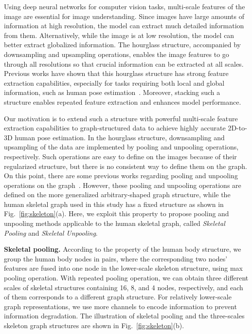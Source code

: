 \documentclass[final]{cvpr}
\begin{document}
Using deep neural networks for computer vision tasks, multi-scale features of the image are essential for image understanding.
Since images have large amounts of information at high resolution, the model can extract much detailed information from them. Alternatively, while the image is at low resolution, the model can better extract globalized information. 
The hourglass structure, accompanied by downsampling and upsampling operations, enables the image features to go through all resolutions so that crucial information can be extracted at all scales.
Previous works have shown that this hourglass structure has strong feature extraction capabilities, especially for tasks requiring both local and global information, such as human pose estimation~\cite{Newell2016StackedHN, NIPS2017_8edd7215}.
Moreover, stacking such a structure enables repeated feature extraction and enhances model performance.

Our motivation is to extend such a structure with powerful multi-scale feature extraction capabilities to graph-structured data to achieve highly accurate 2D-to-3D human pose estimation.
In the hourglass structure, downsampling and upsampling of the data are implemented by pooling and unpooling operations, respectively. 
Such operations are easy to define on the images because of their regularized structure, but there is no consistent way to define them on the graph.
On this point, there are some previous works regarding pooling and unpooling operations on the graph~\cite{gao2019graph, Lee2019SelfAttentionGP}. 
However, these pooling and unpooling operations are defined on the more generalized arbitrary-shaped graph structure, while the human skeletal graph used in this study has a fixed structure as shown in Fig.~\ref{fig:skeleton}(a). 
Here, we exploit this property to propose pooling and unpooling methods applicable to the human skeletal graph, called \textit{Skeletal Pooling} and \textit{Skeletal Unpooling}.

\textbf{Skeletal pooling.}
According to the property of the human body structure, we group the human body nodes in pairs, where the corresponding two nodes' features are fused into one node in the lower-scale skeleton structure, using max pooling operation.
With repeated pooling operation, we can obtain three different scales of skeletal structures containing 16, 8, and 4 nodes, respectively, and each of them corresponds to a different graph structure.
For relatively lower-scale graph representations, we use more channels to encode information to prevent information degradation.
The illustration of skeletal pooling and the three-scales skeleton graph structures are shown in Fig.~\ref{fig:skeleton}(b).
\end{document}
